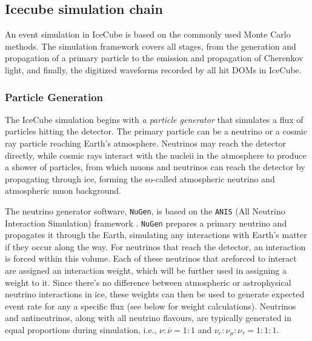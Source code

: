 \subsection{Icecube simulation chain}
\label{sec:sim_ic}
An event simulation in IceCube is based on the commonly used Monte Carlo methods. The simulation framework covers all stages, from the generation and propagation of a primary particle to the emission and propagation of Cherenkov light, and finally, the digitized waveforms recorded by all hit DOMs in IceCube. 

\subsubsection*{Particle Generation}
The IceCube simulation begins with \emph{a particle generator} that simulates a flux of particles hitting the detector. The primary particle can be a neutrino or a cosmic ray particle reaching Earth's atmosphere. Neutrinos may reach the detector directly, while cosmic rays interact with the nucleii in the atmosphere to produce a shower of particles, from which muons and neutrinos can reach the detector by propagating through ice, forming the so-called atmospheric neutrino and atmospheric muon background.

The neutrino generator software, \texttt{NuGen}, is based on the \texttt{ANIS} (All Neutrino Interaction Simulation) framework . \texttt{NuGen} prepares a primary neutrino and propagates it through the Earth, simulating any interactions with Earth’s matter if they occur along the way. For neutrinos that reach the detector, an interaction is forced within this volume. Each of these neutrinos that areforced to interact are assigned an interaction weight, which will be further used in assigning a weight to it. Since there's no difference between atmospheric or astrophysical neutrino interactions in ice, these weights can then be used to generate expected event rate for any a specific flux (see below for weight calculations). Neutrinos and antineutrinos, along with all neutrino flavours, are typically generated in equal proportions during simulation, i.e., \(\nu : \bar{\nu} = 1 : 1\) and \(\nu_e : \nu_{\mu} : \nu_{\tau} = 1 : 1 : 1\).

